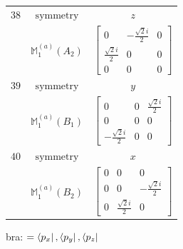 \documentclass[fleqn,8pt,landscape]{jsarticle}
\begin{document}
\begin{longtable}{ccc}
$ 38 $ & $ \text{symmetry} $ & $ z $ \\
$  $ & $ \mathbb{M}_{1}^{(a)}(A_{2}) $ & $ \begin{bmatrix} 0 & - \frac{\sqrt{2} i}{2} & 0 \\ \frac{\sqrt{2} i}{2} & 0 & 0 \\ 0 & 0 & 0 \end{bmatrix} $ \\ \hline
$ 39 $ & $ \text{symmetry} $ & $ y $ \\
$  $ & $ \mathbb{M}_{1}^{(a)}(B_{1}) $ & $ \begin{bmatrix} 0 & 0 & \frac{\sqrt{2} i}{2} \\ 0 & 0 & 0 \\ - \frac{\sqrt{2} i}{2} & 0 & 0 \end{bmatrix} $ \\ \hline
$ 40 $ & $ \text{symmetry} $ & $ x $ \\
$  $ & $ \mathbb{M}_{1}^{(a)}(B_{2}) $ & $ \begin{bmatrix} 0 & 0 & 0 \\ 0 & 0 & - \frac{\sqrt{2} i}{2} \\ 0 & \frac{\sqrt{2} i}{2} & 0 \end{bmatrix} $ \\ \hline
\end{longtable}
bra: $=\bra{p_{x}}, \bra{p_{y}}, \bra{p_{z}}$
\end{document}
